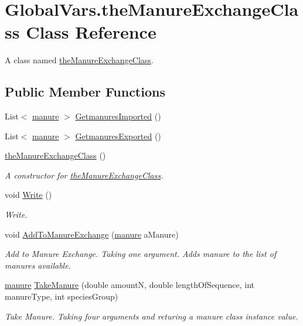 \hypertarget{class_global_vars_1_1the_manure_exchange_class}{}\section{Global\+Vars.\+the\+Manure\+Exchange\+Class Class Reference}
\label{class_global_vars_1_1the_manure_exchange_class}


A class named \mbox{\hyperlink{class_global_vars_1_1the_manure_exchange_class}{the\+Manure\+Exchange\+Class}}.  


\subsection*{Public Member Functions}
\begin{DoxyCompactItemize}
\item 
List$<$ \mbox{\hyperlink{classmanure}{manure}} $>$ \mbox{\hyperlink{class_global_vars_1_1the_manure_exchange_class_aa35f94ee25e0788755da61d187f32c25}{Getmanures\+Imported}} ()
\item 
List$<$ \mbox{\hyperlink{classmanure}{manure}} $>$ \mbox{\hyperlink{class_global_vars_1_1the_manure_exchange_class_a2525db95b29f8b0ed3ea31be425245ee}{Getmanures\+Exported}} ()
\item 
\mbox{\hyperlink{class_global_vars_1_1the_manure_exchange_class_a81c638e25498afce3347dcb34bf1744a}{the\+Manure\+Exchange\+Class}} ()
\begin{DoxyCompactList}\small\item\em A constructor for \mbox{\hyperlink{class_global_vars_1_1the_manure_exchange_class}{the\+Manure\+Exchange\+Class}}. \end{DoxyCompactList}\item 
void \mbox{\hyperlink{class_global_vars_1_1the_manure_exchange_class_a8e150f91a33d2d0a723b2d1646087da1}{Write}} ()
\begin{DoxyCompactList}\small\item\em Write. \end{DoxyCompactList}\item 
void \mbox{\hyperlink{class_global_vars_1_1the_manure_exchange_class_aa73016736e7fb5158a6317c9e0e8304f}{Add\+To\+Manure\+Exchange}} (\mbox{\hyperlink{classmanure}{manure}} a\+Manure)
\begin{DoxyCompactList}\small\item\em Add to Manure Exchange. Taking one argument. Adds manure to the list of manures available. \end{DoxyCompactList}\item 
\mbox{\hyperlink{classmanure}{manure}} \mbox{\hyperlink{class_global_vars_1_1the_manure_exchange_class_a0bf102dc17ba51eb5874fef24bc979bc}{Take\+Manure}} (double amountN, double length\+Of\+Sequence, int manure\+Type, int species\+Group)
\begin{DoxyCompactList}\small\item\em Take Manure. Taking four arguments and returing a manure class instance value. \end{DoxyCompactList}\end{DoxyCompactItemize}


